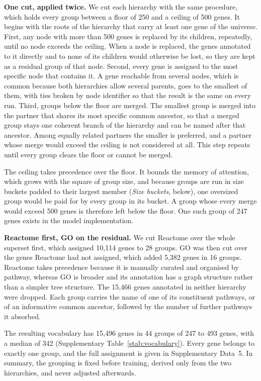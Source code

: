 \textbf{One cut, applied twice.} We cut each hierarchy with the same
procedure, which holds every group between a floor of 250 and a ceiling of
500 genes. It begins with the roots of the hierarchy that carry at least
one gene of the universe. First, any node with more than 500 genes is
replaced by its children, repeatedly, until no node exceeds the ceiling.
When a node is replaced, the genes annotated to it directly and to none of
its children would otherwise be lost, so they are kept as a residual
group of that node. Second, every gene is assigned to the most specific
node that contains it. A gene reachable from several nodes, which is
common because both hierarchies allow several parents, goes to the
smallest of them, with ties broken by node identifier so that the result
is the same on every run. Third, groups below the floor are merged. The
smallest group is merged into the partner that shares its most specific
common ancestor, so that a merged group stays one coherent branch of the
hierarchy and can be named after that ancestor. Among equally related
partners the smaller is preferred, and a partner whose merge would exceed
the ceiling is not considered at all. This step repeats until every group
clears the floor or cannot be merged.

The ceiling takes precedence over the floor. It bounds the memory of
attention, which grows with the square of group size, and because groups
are run in size buckets padded to their largest member
(\emph{Size buckets}, below), one oversized group would be paid for by
every group in its bucket. A group whose every
merge would exceed 500 genes is therefore left below the floor. One such 
group of 247 genes exists in the model implementation.

\textbf{Reactome first, GO on the residual.} We cut Reactome over the
whole superset first, which assigned 10{,}114 genes to 28 groups. GO was
then cut over the genes Reactome had not assigned, which added 5{,}382
genes in 16 groups. Reactome takes precedence because it is manually curated and organised
by pathway, whereas GO is broader and its annotation has a graph structure
rather than a simpler tree structure. The 15{,}466 genes annotated in 
neither hierarchy were dropped. Each group carries the name of one of 
its constituent pathways, or of an informative common ancestor, followed 
by the number of further pathways it absorbed.

The resulting vocabulary has 15{,}496 genes in 44 groups of 247 to 493
genes, with a median of 342 (Supplementary Table~\ref{stab:vocabulary}).
Every gene belongs to exactly one group, and the full assignment is given
in Supplementary Data~5. In summary, the grouping is fixed before
training, derived only from the two hierarchies, and never adjusted
afterwards.

